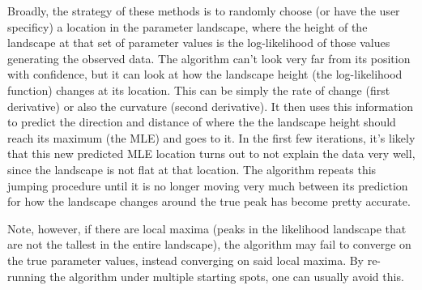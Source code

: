 \documentclass[12pt]{article}
\begin{document}
Broadly, the strategy of these methods is to randomly choose (or have the user specificy) a location in the parameter landscape, where the height of the landscape at that set of parameter values is the log-likelihood of those values generating the observed data.
The algorithm can't look very far from its position with confidence, but it can look at how the landscape height (the log-likelihood function) changes at its location.
This can be simply the rate of change (first derivative) or also the curvature (second derivative).
It then uses this information to predict the direction and distance of where the the landscape height should reach its maximum (the MLE) and goes to it.
In the first few iterations, it's likely that this new predicted MLE location turns out to not explain the data very well, since the landscape is not flat at that location.
The algorithm  repeats this jumping procedure until it is no longer moving very much between its prediction for how the landscape changes around the true peak has become pretty accurate.

Note, however, if there are local maxima (peaks in the likelihood landscape that are not the tallest in the entire landscape), the algorithm may fail to converge on the true parameter values, instead converging on said local maxima.
By re-running the algorithm under multiple starting spots, one can usually avoid this.
\end{document}
